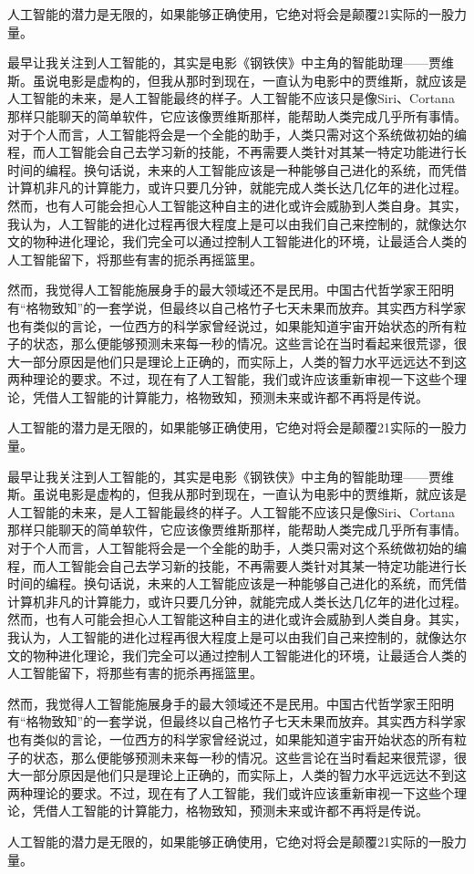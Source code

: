 \documentclass[UTF8]{XJTUthesis}
\begin{document}
人工智能的潜力是无限的，如果能够正确使用，它绝对将会是颠覆21实际的一股力量。\par
最早让我关注到人工智能的，其实是电影《钢铁侠》中主角的智能助理——贾维斯。虽说电影是虚构的，但我从那时到现在，一直认为电影中的贾维斯，就应该是人工智能的未来，是人工智能最终的样子。人工智能不应该只是像Siri、Cortana那样只能聊天的简单软件，它应该像贾维斯那样，能帮助人类完成几乎所有事情。对于个人而言，人工智能将会是一个全能的助手，人类只需对这个系统做初始的编程，而人工智能会自己去学习新的技能，不再需要人类针对其某一特定功能进行长时间的编程。换句话说，未来的人工智能应该是一种能够自己进化的系统，而凭借计算机非凡的计算能力，或许只要几分钟，就能完成人类长达几亿年的进化过程。然而，也有人可能会担心人工智能这种自主的进化或许会威胁到人类自身。其实，我认为，人工智能的进化过程再很大程度上是可以由我们自己来控制的，就像达尔文的物种进化理论，我们完全可以通过控制人工智能进化的环境，让最适合人类的人工智能留下，将那些有害的扼杀再摇篮里。\par
然而，我觉得人工智能施展身手的最大领域还不是民用。中国古代哲学家王阳明有“格物致知”的一套学说，但最终以自己格竹子七天未果而放弃。其实西方科学家也有类似的言论，一位西方的科学家曾经说过，如果能知道宇宙开始状态的所有粒子的状态，那么便能够预测未来每一秒的情况。这些言论在当时看起来很荒谬，很大一部分原因是他们只是理论上正确的，而实际上，人类的智力水平远远达不到这两种理论的要求。不过，现在有了人工智能，我们或许应该重新审视一下这些个理论，凭借人工智能的计算能力，格物致知，预测未来或许都不再将是传说。\par
人工智能的潜力是无限的，如果能够正确使用，它绝对将会是颠覆21实际的一股力量。\par
最早让我关注到人工智能的，其实是电影《钢铁侠》中主角的智能助理——贾维斯。虽说电影是虚构的，但我从那时到现在，一直认为电影中的贾维斯，就应该是人工智能的未来，是人工智能最终的样子。人工智能不应该只是像Siri、Cortana那样只能聊天的简单软件，它应该像贾维斯那样，能帮助人类完成几乎所有事情。对于个人而言，人工智能将会是一个全能的助手，人类只需对这个系统做初始的编程，而人工智能会自己去学习新的技能，不再需要人类针对其某一特定功能进行长时间的编程。换句话说，未来的人工智能应该是一种能够自己进化的系统，而凭借计算机非凡的计算能力，或许只要几分钟，就能完成人类长达几亿年的进化过程。然而，也有人可能会担心人工智能这种自主的进化或许会威胁到人类自身。其实，我认为，人工智能的进化过程再很大程度上是可以由我们自己来控制的，就像达尔文的物种进化理论，我们完全可以通过控制人工智能进化的环境，让最适合人类的人工智能留下，将那些有害的扼杀再摇篮里。\par
然而，我觉得人工智能施展身手的最大领域还不是民用。中国古代哲学家王阳明有“格物致知”的一套学说，但最终以自己格竹子七天未果而放弃。其实西方科学家也有类似的言论，一位西方的科学家曾经说过，如果能知道宇宙开始状态的所有粒子的状态，那么便能够预测未来每一秒的情况。这些言论在当时看起来很荒谬，很大一部分原因是他们只是理论上正确的，而实际上，人类的智力水平远远达不到这两种理论的要求。不过，现在有了人工智能，我们或许应该重新审视一下这些个理论，凭借人工智能的计算能力，格物致知，预测未来或许都不再将是传说。\par
人工智能的潜力是无限的，如果能够正确使用，它绝对将会是颠覆21实际的一股力量。\par
\end{document}
